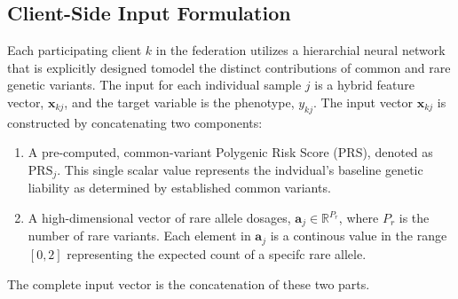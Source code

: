 \documentclass[conference]{IEEEtran}
\begin{document}
\subsection{Client-Side Input Formulation}
\label{ssec:client_side}
Each participating client $k$ in the federation utilizes a hierarchial neural network that is explicitly designed tomodel the distinct contributions of common and rare genetic variants. The input for each individual sample $j$ is a hybrid feature vector, $\mathbf{x}_{kj}$, and the target variable is the phenotype, $y_{kj}$.
The input vector $\mathbf{x}_{kj}$ is constructed by concatenating two components:
\begin{enumerate}
  \item A pre-computed, common-variant Polygenic Risk Score (PRS), denoted as $\text{PRS}_j$. This single scalar value represents the indvidual's baseline genetic liability as determined by established common variants.
  \item A high-dimensional vector of rare allele dosages, $\mathbf{a}_j \in \mathbb{R}^{P_r}$, where $P_r$ is the number of rare variants. Each element in $\mathbf{a}_j$ is a continous value in the range $[0,2]$ representing the expected count of a specifc rare allele.
\end{enumerate}
The complete input vector is the concatenation of these two parts.
\end{document}
